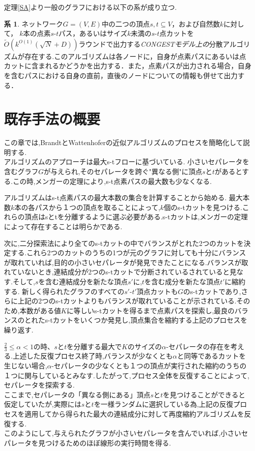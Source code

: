 \documentclass{thesis}
\theoremstyle{definition}
\newtheorem{corollary}{系}
\begin{document}
定理\ref{SA}より一般のグラフにおける以下の系が成り立つ.

\begin{corollary}
    ネットワーク$G=(V,E)$中の二つの頂点$s,t\subseteq V$，および自然数$k$に対して，
    $k$本の点素$s$-$t$パス，あるいはサイズ$k$未満の$s$-$t$点カットを
    $\tilde{O}(k^{O(1)}(\sqrt{N} + D))$ラウンドで出力する\textit{CONGESTモデル上の}分散アルゴリズムが存在する.このアルゴリズムは各ノードに，自身が点素パスにあるいは点カットに含まれるかどうかを出力する．また，点素パスが出力される場合，自身を含むパスにおける自身の直前，直後のノードについての情報も併せて出力する．
    \end{corollary}

\chapter{既存手法の概要}

この章では,BrandtとWattenhoferの近似アルゴリズム\cite{brandt2017approximating}のプロセスを簡略化して説明する.\\

アルゴリズムのアプローチは最大s-tフローに基づいている.
小さいセパレータを含むグラフ$G$が与えられ,そのセパレータを跨ぐ"異なる側"に頂点$s$と$t$があるとする.この時,メンガーの定理により,s-t点素パスの最大数も少なくなる.\par
アルゴリズムはs-t点素パスの最大本数の集合を計算することから始める.
最大本数$k$本の各パスから１つの頂点を取ることによって,$k$個のs-tカットを見つける.これらの頂点はsとtを分離するように選ぶ必要がある.s-tカットは,メンガーの定理によって存在することは明らかである.\par

次に,二分探索法により全てのs-tカットの中でバランスがとれた2つのカットを決定する.これら2つのカットのうちの1つが元のグラフに対しても十分にバランスが取れていれば,目的の小さいセパレータが発見できたことになる.バランスが取れていないとき,連結成分が2つのs-tカットで分断されているされていると見なす.そして,$s$を含む連結成分を新たな頂点$s'$に,$t$を含む成分を新たな頂点$t'$に縮約する.
新しく得られたグラフのすべての$s'$-$t'$頂点カットも$G$のs-tカットであり,さらに上記の2つのs-tカットよりもバランスが取れていることが示されている.そのため,本数がある値$K$に等しいs-tカットを得るまで点素パスを探索し,最良のバランスのとれたs-tカットをいくつか発見し,頂点集合を縮約する上記のプロセスを繰り返す.\par

$\frac{2}{3} \leq \alpha < 1$の時、$s$と$t$を分離する最大で$K$のサイズの$\alpha$-セパレータの存在を考える.上述した反復プロセス終了時,バランスが少なくとも$\alpha$と同等であるカットを生じない場合,$\alpha$-セパレータの少なくとも１つの頂点が実行された縮約のうちの１つに関与しているとみなす.したがって,プロセス全体を反復することによって,セパレータを探索する.\\
ここまで,セパレータの「異なる側にある」頂点$s$と$t$を見つけることができると仮定していたが,実際には$s$と$t$を一様ランダムに選択している為,上記の反復プロセスを適用してから得られた最大の連結成分に対して再度縮約アルゴリズムを反復する.\\
このようにして,与えられたグラフが小さいセパレータを含んでいれば,小さいセパレータを見つけるためのほぼ線形の実行時間を得る.\par
\end{document}
